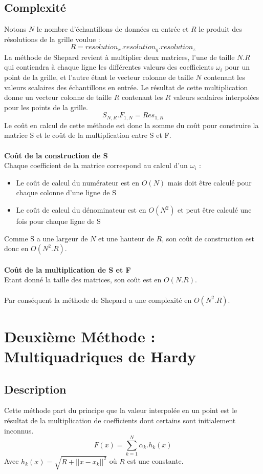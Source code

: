 \documentclass[a4paper,9pt]{article}
\begin{document}
\subsection{Complexité}
\label{subsec:shepard_complexite}
Notons $N$ le nombre d'échantillons de données en entrée et $R$ le produit des résolutions de la grille voulue :
$$R = resolution_{x}.resolution_{y}.resolution_{z}$$
La méthode de Shepard revient à multiplier deux matrices, l'une de taille $N.R$ qui contiendra à chaque ligne les différentes valeurs des coefficients $\omega_{i}$ pour un point de la grille, et l'autre étant le vecteur colonne de taille $N$ contenant les valeurs scalaires des échantillons en entrée. Le résultat de cette multiplication donne un vecteur colonne de taille $R$ contenant les $R$ valeurs scalaires interpolées pour les points de la grille.
$$S_{N,R}.F_{1,N}=Res_{1,R}$$
Le coût en calcul de cette méthode est donc la somme du coût pour construire la matrice S et le coût de la multiplication entre S et F.\\\\
\textbf{Coût de la construction de S}\\
Chaque coefficient de la matrice correspond au calcul d'un $\omega_{i}$ :
\begin{itemize}
\item Le coût de calcul du numérateur est en $O(N)$ mais doit être calculé pour chaque colonne d'une ligne de S
\item Le coût de calcul du dénominateur est en $O(N^{2})$ et peut être calculé une fois pour chaque ligne de S
\end{itemize}
Comme S a une largeur de $N$ et une hauteur de $R$, son coût de construction est donc en $O(N^{2}.R)$.\\\\
\textbf{Coût de la multiplication de S et F}\\
Etant donné la taille des matrices, son coût est en $O(N.R)$.\\\\
Par conséquent la méthode de Shepard a une complexité en \textbf{$O(N^{2}.R)$}.


\section{Deuxième Méthode : Multiquadriques de Hardy}
\label{sec:hardy}

\subsection{Description}
\label{subsec:hardy_description}
Cette méthode part du principe que la valeur interpolée en un point est le résultat de la multiplication de coefficients dont certains sont initialement inconnus.
$$F(x)=\sum_{k=1}^{N} \alpha_{k}.h_{k}(x)$$
Avec $h_{k}(x) = \sqrt{R+||x-x_{k}||^{2}}$ où $R$ est une constante.\\
\end{document}
